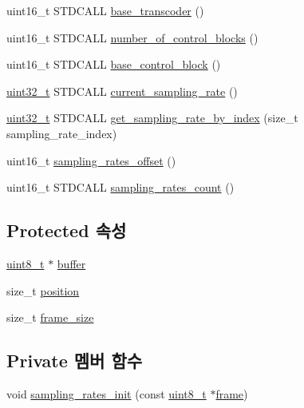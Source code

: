 \begin{DoxyCompactItemize}
uint16\+\_\+t S\+T\+D\+C\+A\+LL \hyperlink{classavdecc__lib_1_1audio__unit__descriptor__response__imp_a60f194156199b4e36aa1aaa4f5f101ac}{base\+\_\+transcoder} ()
\item 
uint16\+\_\+t S\+T\+D\+C\+A\+LL \hyperlink{classavdecc__lib_1_1audio__unit__descriptor__response__imp_ab655c8b8b8964e05b7eb6bf1fd8cae0f}{number\+\_\+of\+\_\+control\+\_\+blocks} ()
\item 
uint16\+\_\+t S\+T\+D\+C\+A\+LL \hyperlink{classavdecc__lib_1_1audio__unit__descriptor__response__imp_a5c19d33c65dba93409485035d3e37b8d}{base\+\_\+control\+\_\+block} ()
\item 
\hyperlink{parse_8c_a6eb1e68cc391dd753bc8ce896dbb8315}{uint32\+\_\+t} S\+T\+D\+C\+A\+LL \hyperlink{classavdecc__lib_1_1audio__unit__descriptor__response__imp_a8b01de9e6fc7f170f68e56d8ede21e54}{current\+\_\+sampling\+\_\+rate} ()
\item 
\hyperlink{parse_8c_a6eb1e68cc391dd753bc8ce896dbb8315}{uint32\+\_\+t} S\+T\+D\+C\+A\+LL \hyperlink{classavdecc__lib_1_1audio__unit__descriptor__response__imp_a4d593e1998dad0355411ef9918d1c5d4}{get\+\_\+sampling\+\_\+rate\+\_\+by\+\_\+index} (size\+\_\+t sampling\+\_\+rate\+\_\+index)
\item 
uint16\+\_\+t \hyperlink{classavdecc__lib_1_1audio__unit__descriptor__response__imp_abb0abe345654eb870a5545190c824846}{sampling\+\_\+rates\+\_\+offset} ()
\item 
uint16\+\_\+t S\+T\+D\+C\+A\+LL \hyperlink{classavdecc__lib_1_1audio__unit__descriptor__response__imp_a2b813db0314210fe2bb1a249044628d4}{sampling\+\_\+rates\+\_\+count} ()
\end{DoxyCompactItemize}
\subsection*{Protected 속성}
\begin{DoxyCompactItemize}
\item 
\hyperlink{stdint_8h_aba7bc1797add20fe3efdf37ced1182c5}{uint8\+\_\+t} $\ast$ \hyperlink{classavdecc__lib_1_1descriptor__response__base__imp_a56ed84df35de10bdb65e72b184309497}{buffer}
\item 
size\+\_\+t \hyperlink{classavdecc__lib_1_1descriptor__response__base__imp_a7a04afe5347934be732ec70a70bd0a28}{position}
\item 
size\+\_\+t \hyperlink{classavdecc__lib_1_1descriptor__response__base__imp_affd041a595cabab98275245b9cb2824d}{frame\+\_\+size}
\end{DoxyCompactItemize}
\subsection*{Private 멤버 함수}
\begin{DoxyCompactItemize}
\item 
void \hyperlink{classavdecc__lib_1_1audio__unit__descriptor__response__imp_ab8a665e6ba5c445926238634d7fabfb8}{sampling\+\_\+rates\+\_\+init} (const \hyperlink{stdint_8h_aba7bc1797add20fe3efdf37ced1182c5}{uint8\+\_\+t} $\ast$\hyperlink{gst__avb__playbin_8c_ac8e710e0b5e994c0545d75d69868c6f0}{frame})
\end{DoxyCompactItemize}
